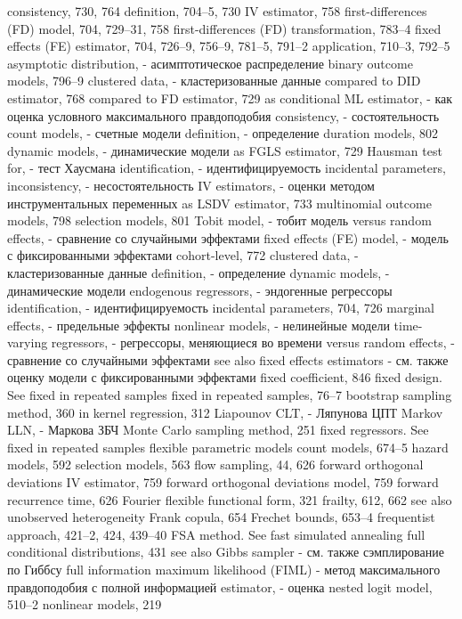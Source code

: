 consistency, 730, 764 definition, 704–5, 730 IV estimator, 758
first-differences (FD) model, 704, 729–31, 758 first-differences (FD) transformation, 783–4 fixed effects (FE) estimator, 704, 726–9, 756–9,
781–5, 791–2
application, 710–3, 792–5
asymptotic distribution, - асимптотическое распределение
binary outcome models, 796–9
clustered data, - кластеризованные данные
compared to DID estimator, 768
compared to FD estimator, 729
as conditional ML estimator, - как оценка условного максимального правдоподобия
consistency, - состоятельность
count models, - счетные модели
definition, - определение
duration models, 802
dynamic models, - динамические модели 
as FGLS estimator, 729
Hausman test for, - тест Хаусмана
identification, - идентифицируемость
incidental parameters,
inconsistency, - несостоятельность 
IV estimators, - оценки методом инструментальных переменных
as LSDV estimator, 733 
multinomial outcome models, 798 selection models, 801
Tobit model, - тобит модель
versus random effects, - сравнение со случайными эффектами
fixed effects (FE) model, - модель с фиксированными эффектами
cohort-level, 772
clustered data, - кластеризованные данные
definition, - определение
dynamic models, - динамические модели 
endogenous regressors, - эндогенные регрессоры
identification, - идентифицируемость
incidental parameters, 704, 726
marginal effects, - предельные эффекты
nonlinear models, - нелинейные модели 
time-varying regressors, - регрессоры, меняющиеся во времени
versus random effects, - сравнение со случайными эффектами
see also fixed effects estimators - см. также оценку модели с фиксированными эффектами
fixed coefficient, 846
fixed design. See fixed in repeated samples fixed in repeated samples, 76–7
bootstrap sampling method, 360 
in kernel regression, 312 
Liapounov CLT, - Ляпунова ЦПТ
Markov LLN, - Маркова ЗБЧ
Monte Carlo sampling method, 251
fixed regressors. See fixed in repeated samples flexible parametric models
count models, 674–5 hazard models, 592 selection models, 563
flow sampling, 44, 626
forward orthogonal deviations IV estimator, 759 forward orthogonal deviations model, 759 forward recurrence time, 626
Fourier flexible functional form, 321
frailty, 612, 662
see also unobserved heterogeneity Frank copula, 654
Frechet bounds, 653–4
frequentist approach, 421–2, 424, 439–40 FSA method. See fast simulated annealing full conditional distributions, 431
see also Gibbs sampler - см. также сэмплирование по Гиббсу
full information maximum likelihood (FIML) - метод максимального правдоподобия с полной информацией
estimator, - оценка
nested logit model, 510–2 nonlinear models, 219
